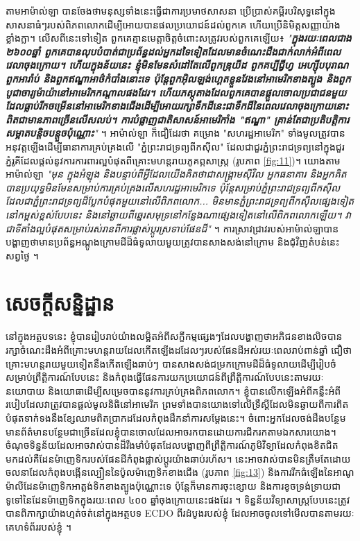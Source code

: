 \documentclass[10pt,twocolumn,letterpaper]{article}
\begin{document}
តាមអាម៉ាល់ឡា បានចែងថាមនុស្សទាំងនេះធ្វើជាការប្រមាថសាសនា ប្រើប្រាស់គម្ពីរបរិសុទ្ធនៅក្នុងសាសនាធំៗរបស់ពិភពលោកដើម្បីអោយបានផលប្រយោជន៍ដល់ពួកគេ ហើយប្រើនិមិត្តសញ្ញាយ៉ាងខ្លាំងក្លា។ លើសពីនេះទៅទៀត ពួកគេគ្មានមេត្តាចិត្តចំពោះសត្រូវរបស់ពួកគេឡើយ៖ \textit{"\textbf{ក្នុងរយៈពេលជាង ២៦០០ឆ្នាំ ពួកគេបានលុបបំបាត់ជាប្រព័ន្ធដល់អ្នកដទៃទៀតដែលមានចំណេះដឹងជាក់លាក់អំពីពេលវេលាចុងក្រោយ។ ហើយក្នុងន័យនេះ ខ្ញុំមិនមែនសំដៅតែលើពួកឌ្រុយីដ ពួកគប្បីជ្វីហ្វ អេហ្ស៊ីបបុរាណ ពួកអារ៉ាប់ និងពួកឥណ្ឌាអាថ៌កំបាំងនោះទេ ប៉ុន្តែពួកអ៊ិលឡង់ហ្គេតខ្លួនវែងនៅអាមេរិកខាងត្បូង និងពួកបូជាចារ្យម៉ាយ៉ានៅអាមេរិកកណ្តាលផងដែរ។ ហើយភស្តុតាងដែលពួកគេបានផ្តួលចោលប្រជាជនមួយដែលធ្លាប់រីកចម្រើននៅអាមេរិកខាងជើងដើម្បីអោយរក្សាទឹកដីនេះជាទឹកដីនៃពេលវេលាចុងក្រោយនោះ ពិតជាមានភាពច្រើនលើសលប់។ ការបំផ្លាញជាតិសាសន៍អាមេរិកាំង "ឥណ្ឌា" គ្រាន់តែជាប្រតិបត្តិការសម្អាតបន្តិចបន្តួចប៉ុណ្ណោះ}"} \cite{33,34}។
អាម៉ាល់ឡា ក៏ជឿដែរថា គម្រោង "សហរដ្ឋអាមេរិក" ទាំងមូលត្រូវបានអនុវត្តឡើងដើម្បីធានាការគ្រប់គ្រងលើ "ភ្នំព្រះរាជទ្រព្យពីកស៊ីល" ដែលជាជួរភ្នំព្រះរាជទ្រព្យនៅក្នុងជួរភ្នំរូគីដែលផ្តល់នូវការការពារល្អបំផុតពីគ្រោះមហន្តរាយភូគព្ភសាស្ត្រ (រូបភាព \ref{fig:11})។ យោងតាមអាម៉ាល់ឡា \textit{"មុន ក្នុងអំឡុង និងបន្ទាប់ពីអ្វីដែលយើងគិតថាជាសង្គ្រាមស៊ីវិល អ្នកធនាគារ និងអ្នកគិតបានប្រយុទ្ធមិនមែនសម្រាប់ការគ្រប់គ្រងលើសហរដ្ឋអាមេរិកទេ ប៉ុន្តែសម្រាប់ភ្នំព្រះរាជទ្រព្យពីកស៊ីល ដែលជាភ្នំព្រះរាជទ្រព្យដ៏ប្លែកបំផុតមួយនៅលើពិភពលោក... មិនមានភ្នំព្រះរាជទ្រព្យពីកស៊ីលផ្សេងទៀតនៅកម្ពស់ខ្ពស់បែបនេះ និងនៅឆ្ងាយពីឆ្នេរសមុទ្រនៅកន្លែងណាផ្សេងទៀតនៅលើពិភពលោកឡើយ។ វាជាទីតាំងល្អបំផុតសម្រាប់រស់រានពីការផ្លាស់ប្តូរស្រទាប់ផែនដី"} \cite{33,34}។ ការស្រាវជ្រាវរបស់អាម៉ាល់ឡាបានបង្ហាញថាមានប្រព័ន្ធអណ្តូងក្រោមដីដ៏ធំទូលាយមួយត្រូវបានសាងសង់នៅក្រោម និងជុំវិញតំបន់នេះសព្វថ្ងៃ \cite{36}។

\section{សេចក្តីសន្និដ្ឋាន}

នៅក្នុងអត្ថបទនេះ ខ្ញុំបានរៀបរាប់យ៉ាងលម្អិតអំពីសក្ខីកម្មផ្សេងៗដែលបង្ហាញថាអភិជនខាងលិចបានរក្សាចំណេះដឹងអំពីគ្រោះមហន្តរាយដែលកើតឡើងដដែលៗរបស់ផែនដីអស់រយៈពេលរាប់ពាន់ឆ្នាំ ជឿថាគ្រោះមហន្តរាយមួយទៀតនឹងកើតឡើងឆាប់ៗ បានសាងសង់ជម្រកក្រោមដីដ៏ធំទូលាយដើម្បីរៀបចំសម្រាប់ព្រឹត្តិការណ៍បែបនេះ និងកំពុងធ្វើផែនការយកប្រយោជន៍ពីព្រឹត្តិការណ៍បែបនេះតាមរយៈនយោបាយ និងយោធាដើម្បីសម្រេចបាននូវការគ្រប់គ្រងពិភពលោក។ ខ្ញុំបានលើកឡើងអំពីគន្លឹះអំពីរបៀបដែលវាត្រូវបានផ្តល់មូលនិធិនៅអាមេរិក ព្រមទាំងបានយោងទៅលើទ្រឹស្តីដែលមិនឆ្ងាយពីការពិតបំផុតទាក់ទងនឹងខ្សែឈាមពិតប្រាកដដែលកំពុងដឹកនាំការសម្តែងនេះ។ ចំពោះអ្នកដែលចង់ដឹងបន្ថែម មានព័ត៌មានបន្ថែមជាច្រើនដែលខ្ញុំបានចោលដែលអាចរកបានដោយការជីករកតាមឯកសារយោង។
ចំណុចទិន្នន័យដែលអាចវាស់បានដ៏រឹងមាំបំផុតដែលបង្ហាញពីព្រឹត្តិការណ៍ភូមិវិទ្យាដែលកំពុងខិតជិតមកដល់គឺដែនម៉ាញេទិករបស់ផែនដីកំពុងផ្លាស់ប្តូរយ៉ាងឆាប់រហ័ស។ នេះអាចវាស់បានមិនត្រឹមតែដោយចលនាដែលកំពុងបង្កើនល្បឿននៃប៉ូលម៉ាញេទិកខាងជើង (រូបភាព \ref{fig:13}) និងការរីកធំឡើងនៃអាណូម៉ាលីដែនម៉ាញេទិកអាត្លង់ទិកខាងត្បូងប៉ុណ្ណោះទេ ប៉ុន្តែក៏មានការចុះខ្សោយ និងការខូចទ្រង់ទ្រាយជាទូទៅនៃដែនម៉ាញេទិកក្នុងរយៈពេល ៤០០ ឆ្នាំចុងក្រោយនេះផងដែរ \cite{3}។ ទិន្នន័យវិទ្យាសាស្ត្របែបនេះត្រូវបានពិភាក្សាយ៉ាងហ្មត់ចត់នៅក្នុងអត្ថបទ ECDO ពីរដំបូងរបស់ខ្ញុំ ដែលអាចចូលទៅមើលបានតាមរយៈគេហទំព័ររបស់ខ្ញុំ \cite{3}។
\end{document}
